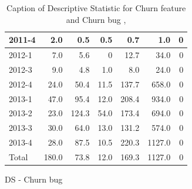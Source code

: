 \documentclass[UKenglish]{ifimaster}  %
\begin{document}
\begin{appendices}
\begin{table}[!htbp]
\begin{adjustwidth}{-1.5cm}{}
\begin{subfigure}[b]{0.3\textwidth}
{\begin{tabular}{ | l | r | r | r | r | r | r | }
2011-4 & 2.0 & 0.5 & 0.5 & 0.7 & 1.0 & 0\\ \hline
2012-1 & 7.0 & 5.6 & 0 & 12.7 & 34.0 & 0\\ \hline
2012-3 & 9.0 & 4.8 & 1.0 & 8.0 & 24.0 & 0\\ \hline
2012-4 & 24.0 & 50.4 & 11.5 & 137.7 & 658.0 & 0\\ \hline
2013-1 & 47.0 & 95.4 & 12.0 & 208.4 & 934.0 & 0\\ \hline
2013-2 & 23.0 & 124.3 & 54.0 & 173.4 & 694.0 & 0\\ \hline
2013-3 & 30.0 & 64.0 & 13.0 & 131.2 & 574.0 & 0\\ \hline
2013-4 & 28.0 & 87.5 & 10.5 & 220.3 & 1127.0 & 0\\ \hline
Total & 180.0 & 73.8 & 12.0 & 169.3 & 1127.0 & 0\\ \hline
\end{tabular}
}
\caption{DS - Churn bug}
 \label{DS:CB:6}
\end{subfigure}
\end{adjustwidth}
\caption[Optional caption for list of figures]{Caption of Descriptive Statistic for Churn feature and Churn bug , }
\label{DS:6:4}
\end{table}




\end{appendices}
\end{document}
